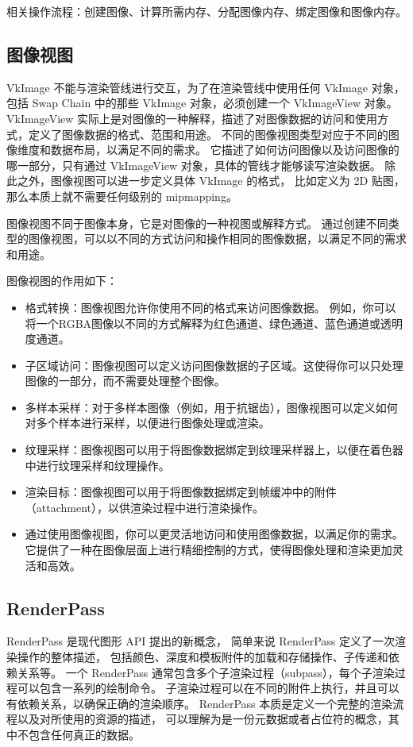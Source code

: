 \documentclass[a4paper, 12pt]{ctexart}
\begin{document}
    相关操作流程：创建图像、计算所需内存、分配图像内存、绑定图像和图像内存。


\clearpage
\subsection{图像视图}
    VkImage 不能与渲染管线进行交互，为了在渲染管线中使用任何 VkImage 对象，
    包括 Swap Chain 中的那些 VkImage 对象，必须创建一个 VkImageView 对象。
    VkImageView 实际上是对图像的一种解释，描述了对图像数据的访问和使用方式，定义了图像数据的格式、范围和用途。
    不同的图像视图类型对应于不同的图像维度和数据布局，以满足不同的需求。
    它描述了如何访问图像以及访问图像的哪一部分，只有通过 VkImageView 对象，具体的管线才能够读写渲染数据。
    除此之外，图像视图可以进一步定义具体 VkImage 的格式，
    比如定义为 2D 贴图，那么本质上就不需要任何级别的 mipmapping。

    图像视图不同于图像本身，它是对图像的一种视图或解释方式。
    通过创建不同类型的图像视图，可以以不同的方式访问和操作相同的图像数据，以满足不同的需求和用途。

    图像视图的作用如下：

\begin{itemize}[itemindent=1em, itemsep=0pt, topsep=0pt, parsep=0pt]
    \item 格式转换：图像视图允许你使用不同的格式来访问图像数据。
            例如，你可以将一个RGBA图像以不同的方式解释为红色通道、绿色通道、蓝色通道或透明度通道。
    \item 子区域访问：图像视图可以定义访问图像数据的子区域。这使得你可以只处理图像的一部分，而不需要处理整个图像。
    \item 多样本采样：对于多样本图像（例如，用于抗锯齿），图像视图可以定义如何对多个样本进行采样，以便进行图像处理或渲染。
    \item 纹理采样：图像视图可以用于将图像数据绑定到纹理采样器上，以便在着色器中进行纹理采样和纹理操作。
    \item 渲染目标：图像视图可以用于将图像数据绑定到帧缓冲中的附件（attachment），以供渲染过程中进行渲染操作。
    \item 通过使用图像视图，你可以更灵活地访问和使用图像数据，以满足你的需求。
            它提供了一种在图像层面上进行精细控制的方式，使得图像处理和渲染更加灵活和高效。
\end{itemize}


\clearpage
\subsection{RenderPass}
    RenderPass 是现代图形 API 提出的新概念，
    简单来说 RenderPass 定义了一次渲染操作的整体描述，
    包括颜色、深度和模板附件的加载和存储操作、子传递和依赖关系等。
    一个 RenderPass 通常包含多个子渲染过程（subpass），每个子渲染过程可以包含一系列的绘制命令。
    子渲染过程可以在不同的附件上执行，并且可以有依赖关系，以确保正确的渲染顺序。
    RenderPass 本质是定义一个完整的渲染流程以及对所使用的资源的描述，
    可以理解为是一份元数据或者占位符的概念，其中不包含任何真正的数据。
\end{document}
